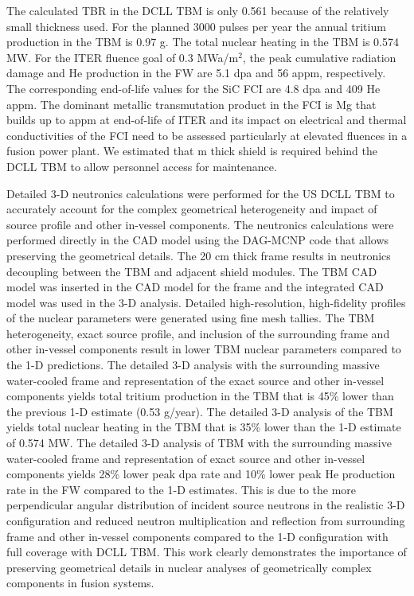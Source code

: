 The calculated \gls{TBR} in the \gls{DCLL} \gls{TBM} is only 0.561 because of
the relatively small thickness used. For the planned 3000 pulses per year the
annual tritium production in the \gls{TBM} is 0.97 g. The total nuclear
heating in the \gls{TBM} is 0.574 MW. For the ITER fluence goal of 0.3
MWa/m$^2$, the peak cumulative radiation damage and He production in the FW
are 5.1 dpa and 56 appm, respectively.  The corresponding end-of-life values
for the SiC \gls{FCI} are 4.8 dpa and 409 He appm. The dominant metallic
transmutation product in the \gls{FCI} is Mg that builds up to 
appm at end-of-life of ITER and its impact on electrical and thermal
conductivities of the \gls{FCI} need to be assessed particularly at elevated
fluences in a fusion power plant. We estimated that  m thick
shield is required behind the \gls{DCLL} \gls{TBM} to allow personnel access
for maintenance.


Detailed 3-D neutronics calculations were performed for the US \gls{DCLL}
\gls{TBM} to accurately account for the complex geometrical heterogeneity and
impact of source profile and other in-vessel components. The neutronics
calculations were performed directly in the \gls{CAD} model using the DAG-MCNP
code that allows preserving the geometrical details. The 20 cm thick frame
results in neutronics decoupling between the \gls{TBM} and adjacent shield
modules. The \gls{TBM} \gls{CAD} model was inserted in the \gls{CAD} model for
the frame and the integrated \gls{CAD} model was used in the 3-D
analysis. Detailed high-resolution, high-fidelity profiles of the nuclear
parameters were generated using fine mesh tallies. The \gls{TBM}
heterogeneity, exact source profile, and inclusion of the surrounding frame
and other in-vessel components result in lower \gls{TBM} nuclear parameters
compared to the 1-D predictions. The detailed 3-D analysis with the
surrounding massive water-cooled frame and representation of the exact source
and other in-vessel components yields total tritium production in the TBM that
is 45\% lower than the previous 1-D estimate (0.53 g/year). The detailed 3-D
analysis of the \gls{TBM} yields total nuclear heating in the \gls{TBM} that
is 35\% lower than the 1-D estimate of 0.574 MW. The detailed 3-D analysis of
TBM with the surrounding massive water-cooled frame and representation of
exact source and other in-vessel components yields 28\% lower peak dpa rate
and 10\% lower peak He production rate in the \gls{FW} compared to the 1-D
estimates. This is due to the more perpendicular angular distribution of
incident source neutrons in the realistic 3-D configuration and reduced
neutron multiplication and reflection from surrounding frame and other
in-vessel components compared to the 1-D configuration with full coverage with
\gls{DCLL} \gls{TBM}. This work clearly demonstrates the importance of
preserving geometrical details in nuclear analyses of geometrically complex
components in fusion systems.


